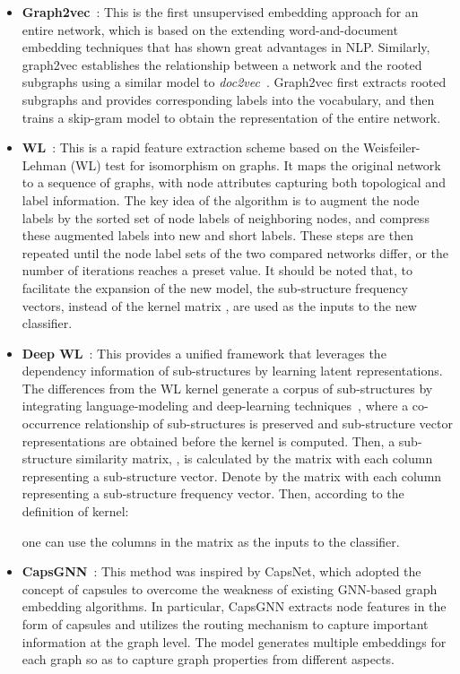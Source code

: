 \documentclass[10pt,journal,compsoc]{IEEEtran}
\begin{document}
\begin{itemize}


\item \textbf{Graph2vec}~\cite{narayanan2017graph2vec}: This is the first unsupervised embedding approach for an entire network, which is based on the extending word-and-document embedding techniques that has shown great advantages in NLP. Similarly, graph2vec establishes the relationship between a network and the rooted subgraphs using a similar model to \emph{doc2vec}~\cite{le2014distributed}. Graph2vec first extracts rooted subgraphs and provides corresponding labels into the vocabulary, and then trains a skip-gram model to obtain the representation of the entire network.

\item \textbf{WL}~\cite{shervashidze2011weisfeiler}: This is a rapid feature extraction scheme based on the Weisfeiler-Lehman (WL) test for isomorphism on graphs. It maps the original network to a sequence of graphs, with node attributes capturing both topological and label information. The key idea of the algorithm is to augment the node labels by the sorted set of node labels of neighboring nodes, and compress these augmented labels into new and short labels. These steps are then repeated until the node label sets of the two compared networks differ, or the number of iterations reaches a preset value. It should be noted that, to facilitate the expansion of the new model, the sub-structure frequency vectors, instead of the kernel matrix , are used as the inputs to the new classifier.

\item \textbf{Deep WL}~\cite{yanardag2015deep}: This provides a unified framework that leverages the dependency information of sub-structures by learning latent representations. The differences from the WL kernel generate a corpus of sub-structures by integrating language-modeling and deep-learning techniques~\cite{bengio2003neural}, where a co-occurrence relationship of sub-structures is preserved and sub-structure vector representations are obtained before the kernel is computed. Then, a sub-structure similarity matrix, , is calculated by the matrix  with each column representing a sub-structure vector. Denote by  the matrix with each column representing a sub-structure frequency vector. Then, according to the definition of kernel:

one can use the columns in the matrix  as the inputs to the classifier.

\item \textbf{CapsGNN}~\cite{xinyi2018capsule}: This method was inspired by CapsNet, which adopted the concept of capsules to overcome the weakness of existing GNN-based graph embedding algorithms. In particular, CapsGNN extracts node features in the form of capsules and utilizes the routing mechanism to capture important information at the graph level. The model generates multiple embeddings for each graph so as to capture graph properties from different aspects.
\end{itemize}
\end{document}
